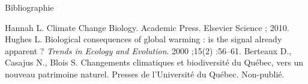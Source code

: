 \documentclass{eecslides}
\begin{document}
	\begin{frame}[plain]{Bibliographie}

	\vspace{0.4cm}
	Hannah L. Climate Change Biology. Academic Press. Elsevier Science ; 2010. \\
	\vspace{0.4cm}
	Hughes L. Biological consequences of global warming : is the signal already apparent ? \textit{Trends in Ecology and Evolution}. 2000 ;15(2) :56–61.
	\vspace{0.4cm}
	Berteaux D., Casajus N., Blois S. Changements climatiques et biodiversité du Québec, vers un nouveau patrimoine naturel. Presses de l'Université du Québec. Non-publié.

	\end{frame}
\end{document}
